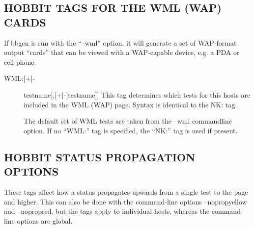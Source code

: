 \subsection{HOBBIT TAGS FOR THE WML (WAP) CARDS}
 If bbgen is run with the ``--wml'' option, it will generate a set of
 WAP-format output ``cards'' that can be viewed with a WAP-capable
 device, e.g. a PDA or cell-phone. 


 \begin{description}
\item[WML:[+|-]testname[,[+|-]testname]] This tag determines which
  tests for this hosts are included in the WML (WAP) page. Syntax is
  identical to the NK: tag. 


  The default set of WML tests are taken from the --wml commandline
  option. If no ``WML:'' tag is specified, the ``NK:'' tag is used if
  present. 




\end{description}

\subsection{HOBBIT STATUS PROPAGATION OPTIONS}
 These tags affect how a status propagates upwards from a single test
 to the page and higher. This can also be done with the command-line
 options --nopropyellow and --nopropred, but the tags apply to
 individual hosts, whereas the command line options are global. 


